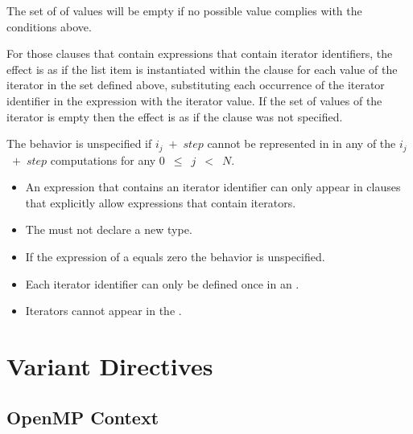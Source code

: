 The set of of values will be empty if no possible value complies with the 
conditions above.

For those clauses that contain expressions that contain iterator identifiers, the
effect is as if the list item is instantiated within the clause for each value
of the iterator in the set defined above, substituting each occurrence of the
iterator identifier in the expression with the iterator value. If the set of
values of the iterator is empty then the effect is as if the clause was not
specified.

The behavior is unspecified if $i_{j}$~$+$~$step$ cannot be represented in 
 in any of the $i_{j}$~$+$~$step$ computations for any 
$0$~$\leq$~$j$~$<$~$N$.

\restrictions

\begin{itemize}
\item An expression that contains an iterator identifier can only appear in 
      clauses that explicitly allow expressions that contain iterators.
\item The  must not declare a new type.
\item If the  expression of a  equals zero 
      the behavior is unspecified.
\item Each iterator identifier can only be defined once in an 
      .
\item Iterators cannot appear in the .
\end{itemize}


\section{Variant Directives}
\label{sec:Variant Directives}

\subsection{OpenMP Context}
\label{subsec:OpenMP Context}

